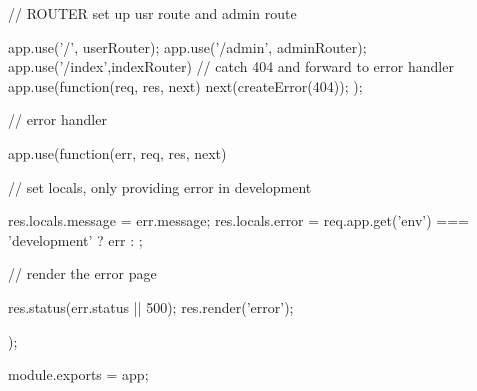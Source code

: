// ROUTER set up usr route and admin route

app.use('/', userRouter); 
app.use('/admin', adminRouter);
app.use('/index',indexRouter)
// catch 404 and forward to error handler
app.use(function(req, res, next) {
  next(createError(404));
});

// error handler

app.use(function(err, req, res, next) {
  
  // set locals, only providing error in development

  res.locals.message = err.message;
  res.locals.error = req.app.get('env') === 'development' ? err : {};

  // render the error page

  res.status(err.status || 500);
  res.render('error');
});

module.exports = app;
